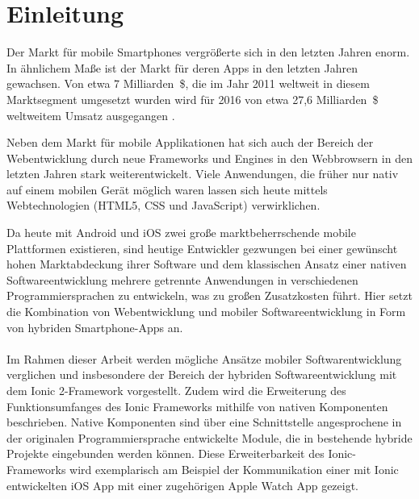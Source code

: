 \chapter{Einleitung}
%
Der Markt für mobile Smartphones vergrößerte sich in den letzten Jahren enorm\cite{ChaffeyMarketStatisticsUsageAndAdoption}. In ähnlichem Maße ist der Markt für deren Apps in den letzten Jahren gewachsen. Von etwa 7 Milliarden~\$, die im Jahr 2011 weltweit in diesem Marktsegment umgesetzt wurden wird für 2016 von etwa 27,6 Milliarden~\$ weltweitem Umsatz ausgegangen \cite{StatistaGlobalRvenues}.

Neben dem Markt für mobile Applikationen hat sich auch der Bereich der Webentwicklung durch neue Frameworks und Engines in den Webbrowsern in den letzten Jahren stark weiterentwickelt. Viele Anwendungen, die früher nur nativ auf einem mobilen Gerät möglich waren lassen sich heute mittels Webtechnologien (HTML5, CSS und JavaScript) verwirklichen.

Da heute mit Android und iOS zwei große marktbeherrschende mobile Plattformen existieren, sind heutige Entwickler gezwungen bei einer gewünscht hohen Marktabdeckung ihrer Software und dem klassischen Ansatz einer nativen Softwareentwicklung mehrere getrennte Anwendungen in verschiedenen Programmiersprachen zu entwickeln, was zu großen Zusatzkosten führt. Hier setzt die Kombination von Webentwicklung und mobiler Softwareentwicklung in Form von hybriden Smartphone-Apps an.
\\
\\
Im Rahmen dieser Arbeit werden mögliche Ansätze mobiler Softwarentwicklung verglichen und insbesondere der Bereich der hybriden Softwareentwicklung mit dem Ionic 2-Framework vorgestellt. Zudem wird die Erweiterung des Funktionsumfanges des Ionic Frameworks mithilfe von nativen Komponenten beschrieben. Native Komponenten sind über eine Schnittstelle angesprochene in der originalen Programmiersprache entwickelte Module, die in bestehende hybride Projekte eingebunden werden können. Diese Erweiterbarkeit des Ionic-Frameworks wird exemplarisch am Beispiel der Kommunikation einer mit Ionic entwickelten iOS App mit einer zugehörigen Apple Watch App gezeigt.